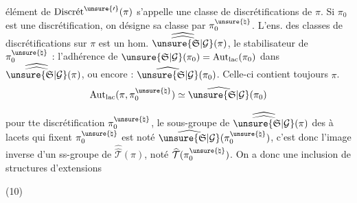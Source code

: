 
 élément de $\operatorname{Discr\acute{e}t}^{\unsure{\prime}}(\pi)$ s'appelle une
classe de discrétifications de $\pi$.
Si $\pi_0$ est une discrétification, on désigne sa classe par
$\pi_0^{\unsure{\natural}}$. L'ens. des classes de discrétifications sur $\pi$
est un  hom. $\widehat{\widehat{\unsure{\mathfrak{S}|\mathcal{G}}}}(\pi)$, le stabilisateur
de $\pi_0^{\unsure{\natural}}$  : l'adhérence de
$\unsure{\mathfrak{S}|\mathcal{G}}(\pi_0)=\operatorname{Aut}_{\mathrm{lac}}(\pi_0)$ dans
$\widehat{\widehat{\unsure{\mathfrak{S}|\mathcal{G}}}}(\pi)$, ou encore :
$\widehat{\unsure{\mathfrak{S}|\mathcal{G}}}(\pi_0)$.
Celle-ci contient toujours $\pi$.
\[
\operatorname{Aut}_{\mathrm{lac}}(\pi,\pi_0^{\unsure{\natural}})
\simeq\widehat{\unsure{\mathfrak{S}|\mathcal{G}}}(\pi_0)
\]

 pour tte discrétification $\pi_0^{\unsure{\natural}}$, le sous-groupe de
$\widehat{\widehat{\unsure{\mathfrak{S}|\mathcal{G}}}}(\pi)$ des  à lacets qui fixent
$\pi_0^{\unsure{\natural}}$ est noté $\widehat{\unsure{\mathfrak{S}|\mathcal{G}}}(\pi_0^{\unsure{\natural}})$,
c'est donc l'image inverse d'un ss-groupe de
$\widehat{\widehat{\mathcal{T}}}(\pi)$, noté
$\widehat{\mathcal{T}}(\pi_0^{\unsure{\natural}})$. On a donc une inclusion de
structures d'extensions

(10)


